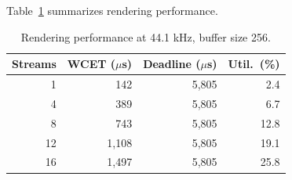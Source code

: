 \documentclass[sigchi, nonacm]{acmart}
\begin{document}


Table~\ref{tab:rendering} summarizes rendering performance.

\begin{table}[t]
\centering
\caption{Rendering performance at 44.1 kHz, buffer size 256. }
\label{tab:rendering}
\small
\begin{tabular}{rrrr}
\toprule
\textbf{Streams} & \textbf{WCET ($\mu$s)} & \textbf{Deadline ($\mu$s)} & \textbf{Util.\ (\%)} \\
\midrule
1 & 142 & 5,805 & 2.4 \\
4 & 389 & 5,805 & 6.7 \\
8 & 743 & 5,805 & 12.8 \\
12 & 1,108 & 5,805 & 19.1 \\
16 & 1,497 & 5,805 & 25.8 \\
\bottomrule
\end{tabular}
\end{table}
\end{document}
